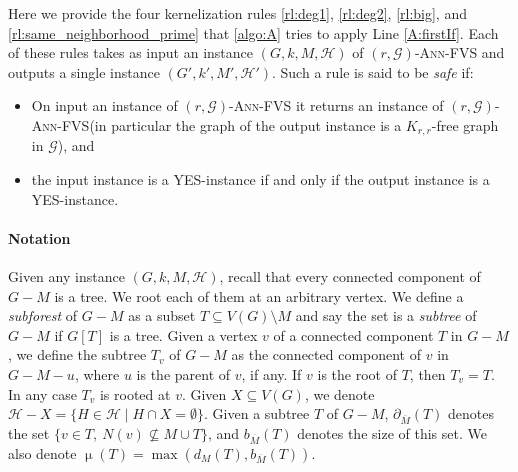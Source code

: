 \documentclass{amsart}
\newcommand{\G}{\mathcal{G}}
\newcommand{\pom}{\partial_{\overline{M}}}
\newcommand{\bom}{b_{\overline{M}}}
\newcommand{\mH}{\mathcal{H}}
\DeclareMathOperator\db{\mu}
\newcommand{\AFVS}{\textsc{$(r,\G)$-Ann-FVS}\xspace}
\newcommand{\ruleref}[1]{\hyperref[#1]{\ref*{#1}}}
\begin{document}
Here we provide the four kernelization rules  \ruleref{rl:deg1}, \ruleref{rl:deg2}, \ruleref{rl:big}, and \ruleref{rl:same_neighborhood_prime} that \autoref{algo:A} tries to apply Line \ref{A:firstIf}.
Each of these rules takes as input an instance $(G,k,M,\mH)$ of \AFVS and outputs a single instance $(G',k',M',\mH')$. Such a rule is said to be {\em safe} if:
\begin{itemize}
    \item On input an instance of \AFVS it returns an instance of \AFVS (in particular the graph of the output instance is a $K_{r,r}$-free graph in $\G$), and
    \item the input instance is a YES-instance if and only if the output instance is a YES-instance.
\end{itemize}

\paragraph{Notation}
Given any instance $(G, k, M, \mH)$, recall that every connected component of $G-M$ is a tree. We root each of them at an arbitrary vertex. We define a {\em subforest} of $G-M$ as a subset $T\subseteq V(G)\setminus M$ and say the set is a {\em subtree} of $G-M$ if $G[T]$ is a tree. Given a vertex $v$ of a connected component $T$ in $G-M$, we define the subtree $T_v$ of $G-M$ as the connected component of $v$ in $G-M-u$, where $u$ is the parent of $v$, if any. If $v$ is the root of $T$, then $T_v=T$. In any case $T_v$ is rooted at $v$.
Given $X \subseteq V(G)$, we denote 
$\mH-X = \{H \in \mH \mid H \cap X = \emptyset\}$. 
 Given a subtree $T$ of $G-M$, $\pom (T)$ denotes the set $\{v\in T,~N(v) \not\subseteq M\cup T \}$, and $\bom (T)$ denotes the size of this set.
 We also denote $\db(T)=\max(d_M(T), \bom(T))$.
\end{document}
